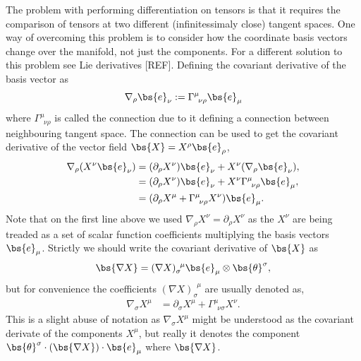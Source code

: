 The problem with performing differentiation on tensors is that it requires the comparison of tensors at two different (infinitessimaly close) tangent spaces. One way of overcoming this problem is to consider how the coordinate basis vectors change over the manifold, not just the components. For a different solution to this problem see Lie derivatives [REF]. Defining the covariant derivative of the basis vector as
\begin{equation}
\nabla_\rho \bs{e}_\nu := \Gamma^\mu_{\,\,\,\nu\rho}\bs{e}_\mu
\end{equation}
where $\Gamma^\mu_{\,\,\,\nu\rho}$ is called the connection due to it defining a connection between neighbouring tangent space. The connection can be used to get the covariant derivative of the vector field $\bs{X}=X^\rho \bs{e}_\rho$,
\begin{align}
\nabla_\rho (X^\nu \bs{e}_\nu) &= (\partial_\rho X^\nu )\bs{e}_\nu + X^\nu (\nabla_\rho \bs{e}_\nu),\\
&= (\partial_\rho X^\nu )\bs{e}_\nu + X^\nu \Gamma^\mu_{\,\,\,\nu\rho}\bs{e}_\mu,\\
&= (\partial_\rho X^\mu + \Gamma^\mu_{\,\,\,\nu\rho} X^\nu )\bs{e}_\mu.
\end{align}
Note that on the first line above we used $\nabla_\rho X^\nu=\partial_\rho X^\nu$ as the $X^\nu$ are being treaded as a set of scalar function coefficients multiplying the basis vectors $\bs{e}_\mu$. Strictly we should write the covariant derivative of $\bs{X}$ as 
\begin{align}
\bs{\nabla X} &= (\nabla X)^{\,\,\,\mu}_\sigma \bs{e}_\mu \otimes \bs{\theta}^\sigma ,\\
\end{align}
but for convenience the coefficients $(\nabla X)^{\,\,\,\mu}_\sigma$ are usually denoted as, 
\begin{align}
{\nabla}_{\sigma} X^\mu &= \partial_\sigma X^\mu + \Gamma^\mu_{\,\,\,\nu\sigma} X^\nu.
\end{align}
This is a slight abuse of notation as $\nabla_\sigma X^\mu$ might be understood as the covariant derivate of the components $X^\mu$, but really it denotes the component $\bs{\theta}^\sigma\cdot(\bs{\nabla X})\cdot \bs{e}_\mu$ where $\bs{\nabla X}$.

